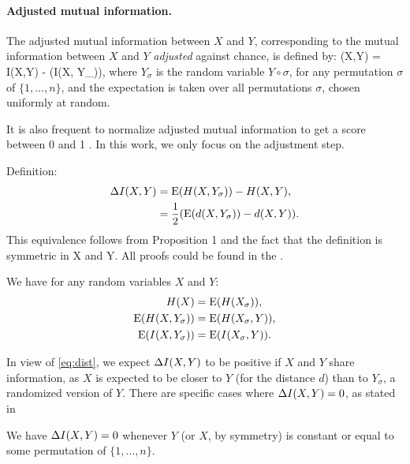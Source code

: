 \paragraph{Adjusted mutual information.}
The adjusted mutual information between $X$ and $Y$, corresponding to  the mutual information between $X$ and $Y$ {\it adjusted} against chance, is defined by:
\be\label{eq:def}
\ia(X,Y) = I(X,Y) - \E(I(X, Y_\sigma)),
\ee
where  $Y_\sigma$ is the random variable $Y \circ \sigma$, for any   permutation $\sigma$ of $\{1,\ldots, n\}$, and the expectation is taken over all permutations $\sigma$, chosen uniformly at random. 

\begin{rem}[Normalization]\label{rem:norm}
	It is also frequent to normalize adjusted mutual information to get a score between 0 and 1 \cite{vinh2010information,romano2014standardized}. In this work, we only focus on the adjustment step. 
\end{rem}

Definition:
\begin{align}
\Delta I(X,Y) &={\rm E}(H(X, Y_\sigma)) - H(X,Y),\nonumber \\ 
&= \frac 1 2 ({\rm E}(d(X, Y_\sigma)) - d(X,Y)).\label{eq:dist}
\end{align}
This equivalence follows from Proposition 1 and the fact that the definition is symmetric
in X and Y. All proofs could be found in the \cite{Lazarenko2021pairwise}.

\begin{prop}\label{prop:equiv}
	We have for any random variables $X$ and $Y$:
	\begin{align*}
	H(X)&= {\rm E}(H(X_\sigma)),\\
	{\rm E}(H(X, Y_\sigma)) &= {\rm E}(H(X_\sigma, Y)),\\
	{\rm E}(I(X, Y_\sigma)) &= {\rm E}(I(X_\sigma, Y)).
	\end{align*}
\end{prop}

In view of \eqref{eq:dist}, we expect $\Delta I(X,Y)$ to be positive if $X$ and $Y$ share information, as $X$ is expected to be closer to $Y$ (for the distance $d$)  than to $Y_\sigma$, a randomized version of $Y$. 
There are specific cases where $\Delta I(X,Y)=0$, as stated in 

\begin{prop}\label{prop:zero}
	We have $\Delta I(X,Y)=0$  whenever $Y$ (or $X$, by symmetry) is constant or equal to some permutation of  $\{1,\ldots,n\}$.
\end{prop}


